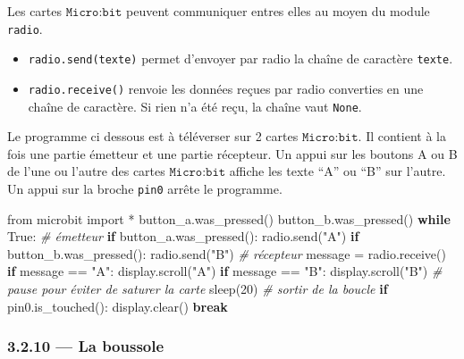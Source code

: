 \documentclass[a4paper,17pt]{extarticle}
\providecommand{\tightlist}{%
      \setlength{\itemsep}{0pt}\setlength{\parskip}{0pt}}
\newenvironment{Shaded}{}{}
\newcommand{\DecValTok}[1]{\textcolor[rgb]{0.25,0.63,0.44}{{#1}}}
\newcommand{\StringTok}[1]{\textcolor[rgb]{0.25,0.44,0.63}{{#1}}}
\newcommand{\CommentTok}[1]{\textcolor[rgb]{0.38,0.63,0.69}{\textit{{#1}}}}
\newcommand{\NormalTok}[1]{{#1}}
\newcommand{\ImportTok}[1]{{#1}}
\newcommand{\VariableTok}[1]{\textcolor[rgb]{0.10,0.09,0.49}{{#1}}}
\newcommand{\ControlFlowTok}[1]{\textcolor[rgb]{0.00,0.44,0.13}{\textbf{{#1}}}}
\newcommand{\OperatorTok}[1]{\textcolor[rgb]{0.40,0.40,0.40}{{#1}}}
\begin{document}
Les cartes \(\texttt{Micro:bit}\) peuvent communiquer entres elles au
moyen du module \texttt{radio}.

\begin{itemize}
\tightlist
\item
  \texttt{radio.send(texte)} permet d'envoyer par radio la chaîne de
  caractère \texttt{texte}.
\item
  \texttt{radio.receive()} renvoie les données reçues par radio
  converties en une chaîne de caractère. Si rien n'a été reçu, la chaîne
  vaut \texttt{None}.
\end{itemize}
\begin{exemple}
    Le programme ci dessous est à téléverser sur 2 cartes
\(\texttt{Micro:bit}\). Il contient à la fois une partie émetteur et une
partie récepteur. Un appui sur les boutons A ou B de l'une ou l'autre
des cartes \(\texttt{Micro:bit}\) affiche les texte ``A'' ou ``B'' sur
l'autre. Un appui sur la broche \texttt{pin0} arrête le programme.

\begin{Shaded}
\begin{Highlighting}[]
\ImportTok{from}\NormalTok{ microbit }\ImportTok{import} \OperatorTok{*}
\NormalTok{button\_a.was\_pressed()}
\NormalTok{button\_b.was\_pressed()}
\ControlFlowTok{while} \VariableTok{True}\NormalTok{:}
    \CommentTok{\# émetteur}
    \ControlFlowTok{if}\NormalTok{ button\_a.was\_pressed():}
\NormalTok{        radio.send(}\StringTok{"A"}\NormalTok{)}
    \ControlFlowTok{if}\NormalTok{ button\_b.was\_pressed():}
\NormalTok{        radio.send(}\StringTok{"B"}\NormalTok{)}
    \CommentTok{\# récepteur}
\NormalTok{    message }\OperatorTok{=}\NormalTok{ radio.receive()}
    \ControlFlowTok{if}\NormalTok{ message }\OperatorTok{==} \StringTok{"A"}\NormalTok{:}
\NormalTok{        display.scroll(}\StringTok{"A"}\NormalTok{)}
    \ControlFlowTok{if}\NormalTok{ message }\OperatorTok{==} \StringTok{"B"}\NormalTok{:}
\NormalTok{        display.scroll(}\StringTok{"B"}\NormalTok{)}
    \CommentTok{\# pause pour éviter de saturer la carte}
\NormalTok{    sleep(}\DecValTok{20}\NormalTok{)}
    \CommentTok{\# sortir de la boucle}
    \ControlFlowTok{if}\NormalTok{ pin0.is\_touched():}
\NormalTok{        display.clear()}
        \ControlFlowTok{break}
\end{Highlighting}
\end{Shaded}

        \end{exemple}
    \hypertarget{la-boussole}{%
\subsubsection{3.2.10 --- La boussole}\label{la-boussole}}
\end{document}
